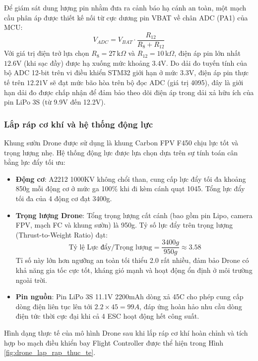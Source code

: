 Để giám sát dung lượng pin nhằm đưa ra cảnh báo hạ cánh an toàn, một mạch cầu phân áp được thiết kế nối từ cực dương pin VBAT về chân ADC (PA1) của MCU:
\begin{equation}
    V_{ADC} = V_{BAT} \cdot \frac{R_{12}}{R_8 + R_{12}}
\end{equation}
Với giá trị điện trở lựa chọn $R_8 = 27\,\text{k}\Omega$ và $R_{12} = 10\,\text{k}\Omega$, điện áp pin lớn nhất $12.6\text{V}$ (khi sạc đầy) được hạ xuống mức khoảng $3.4\text{V}$. Do dải đo tuyến tính của bộ ADC 12-bit trên vi điều khiển STM32 giới hạn ở mức $3.3\text{V}$, điện áp pin thực tế trên $12.21\text{V}$ sẽ đạt mức bão hòa trên bộ đọc ADC (giá trị 4095), đây là giới hạn dải đo được chấp nhận để đảm bảo theo dõi điện áp trong dải xả hữu ích của pin LiPo 3S (từ 9.9V đến 12.2V).

\subsubsection{Lắp ráp cơ khí và hệ thống động lực}

Khung sườn Drone được sử dụng là khung Carbon FPV F450 chịu lực tốt và trọng lượng nhẹ. Hệ thống động lực được lựa chọn dựa trên sự tính toán cân bằng lực đẩy tối ưu:
\begin{itemize}
    \item \textbf{Động cơ}: A2212 1000KV không chổi than, cung cấp lực đẩy tối đa khoảng 850g mỗi động cơ ở mức ga 100\% khi đi kèm cánh quạt 1045. Tổng lực đẩy tối đa của 4 động cơ đạt 3400g.
    \item \textbf{Trọng lượng Drone}: Tổng trọng lượng cất cánh (bao gồm pin Lipo, camera FPV, mạch FC và khung sườn) là 950g. Tỷ số lực đẩy trên trọng lượng (Thrust-to-Weight Ratio) đạt:
    \begin{equation}
        \text{Tỷ lệ Lực đẩy/Trọng lượng} = \frac{3400g}{950g} \approx 3.58
    \end{equation}
    Tỉ số này lớn hơn ngưỡng an toàn tối thiểu 2.0 rất nhiều, đảm bảo Drone có khả năng gia tốc cực tốt, kháng gió mạnh và hoạt động ổn định ở môi trường ngoài trời.
    \item \textbf{Pin nguồn}: Pin LiPo 3S 11.1V 2200mAh dòng xả 45C cho phép cung cấp dòng điện liên tục lên tới $2.2 \times 45 = 99A$, đáp ứng hoàn hảo nhu cầu dòng điện tức thời cực đại khi cả 4 ESC hoạt động hết công suất.
\end{itemize}

Hình dạng thực tế của mô hình Drone sau khi lắp ráp cơ khí hoàn chỉnh và tích hợp bo mạch điều khiển bay Flight Controller được thể hiện trong Hình \ref{fig:drone_lap_rap_thuc_te}.

